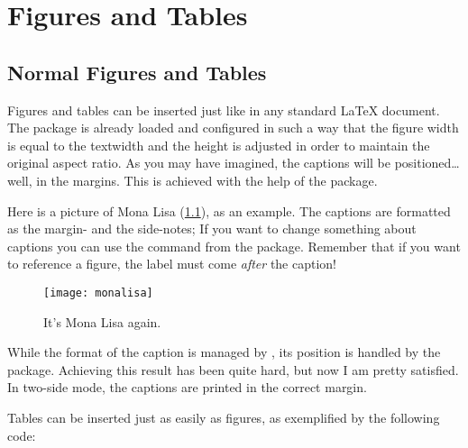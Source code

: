 \setchapterpreamble[u]{\margintoc}
\chapter{Figures and Tables}


\section{Normal Figures and Tables}

Figures and tables can be inserted just like in any standard 
\LaTeX\xspace document. The  package is already loaded 
and configured in such a way that the figure width is equal to the 
textwidth and the height is adjusted in order to maintain the original 
aspect ratio. As you may have imagined, the captions will be 
positioned\ldots well, in the margins. This is achieved with the help of 
the  package.

Here is a picture of Mona Lisa (\cref{normalmonalisa}), as an example. 
The captions are formatted as the margin- and the side-notes; If you 
want to change something about captions you can use the command 
 from the  package. Remember that if 
you want to reference a figure, the label must come \emph{after} the 
caption!

\begin{figure}[hb]
	\texttt{[image: monalisa]}
	\caption[Mona Lisa, again]{It's Mona Lisa again. \blindtext}
	\label{normalmonalisa}
\end{figure}

While the format of the caption is managed by , its 
position is handled by the  package. Achieving this 
result has been quite hard, but now I am pretty satisfied. In two-side 
mode, the captions are printed in the correct margin.

Tables can be inserted just as easily as figures, as exemplified by the 
following code:

